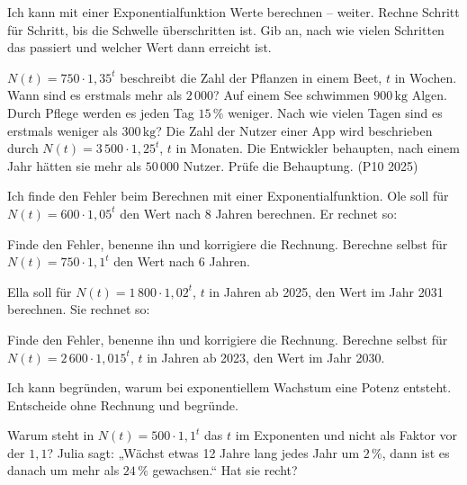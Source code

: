\begin{aufgabe}{Ich kann mit einer Exponentialfunktion Werte berechnen – weiter. Rechne Schritt für Schritt, bis die Schwelle überschritten ist. Gib an, nach wie vielen Schritten das passiert und welcher Wert dann erreicht ist.}
\begin{teile}
\teil $N(t) = 750 \cdot 1{,}35^t$ beschreibt die Zahl der Pflanzen in einem Beet, $t$ in Wochen. Wann sind es erstmals mehr als $2\,000$?
\teil Auf einem See schwimmen $900\,\text{kg}$ Algen. Durch Pflege werden es jeden Tag $15\,\%$ weniger. Nach wie vielen Tagen sind es erstmals weniger als $300\,\text{kg}$?
\teil Die Zahl der Nutzer einer App wird beschrieben durch $N(t) = 3\,500 \cdot 1{,}25^t$, $t$ in Monaten. Die Entwickler behaupten, nach einem Jahr hätten sie mehr als $50\,000$ Nutzer. Prüfe die Behauptung. (P10 2025)
\end{teile}
\end{aufgabe}

\begin{aufgabe}{Ich finde den Fehler beim Berechnen mit einer Exponentialfunktion. Ole soll für $N(t) = 600 \cdot 1{,}05^t$ den Wert nach 8 Jahren berechnen. Er rechnet so:}
\begin{teile}
\teil Finde den Fehler, benenne ihn und korrigiere die Rechnung.
\teil Berechne selbst für $N(t) = 750 \cdot 1{,}1^t$ den Wert nach $6$ Jahren. \quad \leerfeld
\end{teile}
Ella soll für $N(t) = 1\,800 \cdot 1{,}02^t$, $t$ in Jahren ab 2025, den Wert im Jahr 2031 berechnen. Sie rechnet so:
\begin{teile}
\teil Finde den Fehler, benenne ihn und korrigiere die Rechnung.
\teil Berechne selbst für $N(t) = 2\,600 \cdot 1{,}015^t$, $t$ in Jahren ab 2023, den Wert im Jahr 2030. \quad \leerfeld
\end{teile}
\end{aufgabe}

\begin{aufgabe}{Ich kann begründen, warum bei exponentiellem Wachstum eine Potenz entsteht. Entscheide ohne Rechnung und begründe.}
\begin{teile}
\teil Warum steht in $N(t) = 500 \cdot 1{,}1^t$ das $t$ im Exponenten und nicht als Faktor vor der $1{,}1$?
\teil Julia sagt: „Wächst etwas 12 Jahre lang jedes Jahr um $2\,\%$, dann ist es danach um mehr als $24\,\%$ gewachsen.“ Hat sie recht?
\end{teile}
\end{aufgabe}

